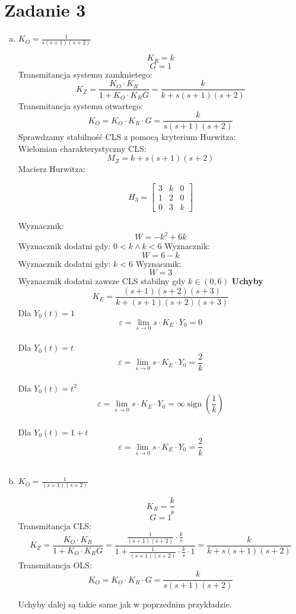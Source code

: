 \documentclass{article}
\begin{document}
    \section*{Zadanie 3}
    \begin{enumerate}[a)]
        \item $K_O=\frac{1}{s \left(s + 1\right) \left(s + 2\right)}$ 
        
        $$K_R=k$$
        $$G=1$$
        Transmitancja systemu zamknietego:
        $$K_Z=\frac{K_O\cdot K_R}{1+K_O\cdot K_RG}=\frac{k}{k + s \left(s + 1\right) \left(s + 2\right)}$$
        Transmitancja systemu otwartego:
        $$K_O=K_O\cdot K_R\cdot G=\frac{k}{s \left(s + 1\right) \left(s + 2\right)}$$
        Sprawdzamy stabilność CLS z pomocą kryterium Hurwitza:\\
        Wielomian charakterystyczny CLS:
        $$M_Z=k + s \left(s + 1\right) \left(s + 2\right)$$
        Macierz Hurwitza:
        
    $$H_{3}=\left[\begin{matrix}3 & k & 0\\1 & 2 & 0\\0 & 3 & k\end{matrix}\right]$$
        
        Wyznacznik:$$W=- k^{2} + 6 k$$ Wyznacznik dodatni gdy: $0 < k \wedge k < 6$\newline
        Wyznacznik:$$W=6 - k$$ Wyznacznik dodatni gdy: $k < 6$\newline
        Wyznacznik:$$W=3$$ Wyznacznik dodatni zawsze\newline
        CLS stabilny gdy $k\in (0,6)$\newpage 
        \textbf{Uchyby}
        $$K_E=\frac{\left(s + 1\right) \left(s + 2\right) \left(s + 3\right)}{k + \left(s + 1\right)
        \left(s + 2\right) \left(s + 3\right)}$$
        Dla $Y_0(t)=1$
        $$\varepsilon=\lim_{s \rightarrow 0} {s\cdot K_E\cdot Y_0}=0$$\\
        Dla $Y_0(t)=t$
        $$\varepsilon=\lim_{s \rightarrow 0} {s\cdot K_E\cdot Y_0}=\frac{2}{k}$$\\
        Dla $Y_0(t)=t^2$
        $$\varepsilon=\lim_{s \rightarrow 0} {s\cdot K_E\cdot Y_0}=\infty \operatorname{sign}{\left(\frac{1}{k} \right)}$$\\
        Dla $Y_0(t)=1+t$
        $$\varepsilon=\lim_{s \rightarrow 0} {s\cdot K_E\cdot Y_0}=\frac{2}{k}$$\\
        \item $K_O=\frac{1}{\left(s + 1\right) \left(s + 2\right)}$
        
        
        $$K_R=\frac{k}{s}$$
        $$G=1$$
        Transmitancja CLS:
        $$K_Z=\frac{K_O\cdot K_R}{1+K_O\cdot K_RG}=\frac{\frac{1}{\left(s + 1\right) \left(s + 2\right)}\cdot \frac{k}{s}}{1+\frac{1}{\left(s + 1\right) \left(s + 2\right)}\cdot \frac{k}{s}\cdot 1}=\frac{k}{k + s \left(s + 1\right) \left(s + 2\right)}$$
        Transmitancja OLS:
        $$K_O=K_O\cdot K_R\cdot G=\frac{k}{s \left(s + 1\right) \left(s + 2\right)}$$

        Uchyby dalej są takie same jak w poprzednim przykładzie.
    \end{enumerate}
        
\end{document}
